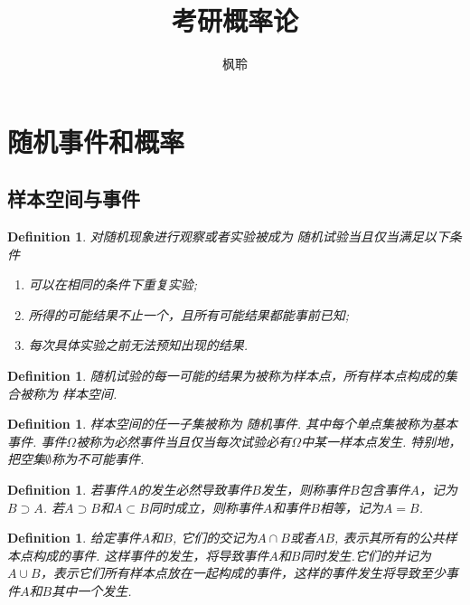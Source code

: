 \documentclass{article}
\newtheorem{definition}[theorem]{Definition}
\begin{document}
\title{考研概率论}
\author{枫聆}
\maketitle

\tableofcontents

\newpage
\section{随机事件和概率}

\subsection{样本空间与事件}

\begin{definition}
\rm 对随机现象进行观察或者实验被成为{\color{red} 随机试验}当且仅当满足以下条件
\begin{enumerate}
	\item 可以在相同的条件下{\color{red}重复实验};
	\item 所得的可能结果不止一个，且所有可能结果都能{\color{red}事前已知};
	\item 每次具体实验之前{\color{red}无法预知}出现的结果.
\end{enumerate}
\end{definition}

\begin{definition}
\rm {\color{red}随机试验}的每一可能的结果为被称为{\color{red}样本点}，所有{\color{red}样本点}构成的集合被称为{\color{red} 样本空间}.
\end{definition}

\begin{definition}
\rm {\color{red} 样本空间}的任一子集被称为{\color{red} 随机事件}. 其中每个单点集被称为{\color{red}基本事件}. 事件$\Omega$被称为{\color{red}必然事件}当且仅当每次试验必有$\Omega$中某一样本点发生. 特别地，把空集$\emptyset$称为{\color{red}不可能事件}.
\end{definition}

\begin{definition}
\rm 若事件$A$的发生{\color{red}必然导致}事件$B$发生，则称事件$B$包含事件$A$，记为$B \supset A$. 若$A \supset B$和$A \subset B$同时成立，则称事件$A$和事件$B$相等，记为$A=B$.
\end{definition}

\begin{definition}
\rm 给定事件$A$和$B$, 它们的交记为$A \cap B$或者$AB$, 表示其所有的公共样本点构成的事件. 这样事件的发生，将导致{\color{red}事件$A$和$B$同时发生}.它们的并记为$A \cup B$，表示它们所有样本点放在一起构成的事件，这样的事件发生将导致{\color{red}至少事件$A$和$B$其中一个发生}.
\end{definition}
\end{document}
